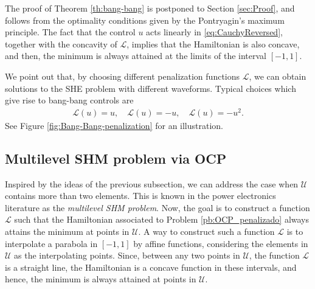 \documentclass[twocolumn]{autart}    %
\begin{document}
The proof of Theorem \ref{th:bang-bang} is postponed to Section \ref{sec:Proof}, and follows from the optimality conditions given by the Pontryagin's maximum principle. The fact that the control $u$ acts linearly in \eqref{eq:CauchyReversed}, together with the concavity of $\mathcal{L}$, implies that the Hamiltonian is also concave, and then, the minimum is always attained at the limits of the interval $[-1,1]$.

We point out that, by choosing different penalization functions $\mathcal{L}$, we can obtain solutions to the SHE problem with different waveforms.
Typical choices which give rise to bang-bang controls are 
\begin{align*}
	\mathcal{L}(u) = u,  \quad \mathcal{L}(u) = -u,  \quad \mathcal{L}(u) = -u^2.
\end{align*} 
See Figure \ref{fig:Bang-Bang-penalization} for an illustration.

\subsection{Multilevel SHM problem via OCP}

Inspired by the ideas of the previous subsection, we can address the case when $\mathcal{U}$ contains more than two elements. This is known in the power electronics literature as the \textit{multilevel SHM problem}. Now, the goal is to construct a function $\mathcal{L}$ such that the Hamiltonian associated to Problem \ref{pb:OCP_penalizado} always attains the minimum at points in $\mathcal{U}$.
A way to construct such a function $\mathcal{L}$ is to interpolate a parabola in $[-1,1]$ by affine functions, considering the elements in $\mathcal{U}$ as the interpolating points.  Since, between any two points in $\mathcal{U}$,  the function $\mathcal{L}$ is a straight line,  the Hamiltonian is a concave function in these intervals, and hence, the minimum is always attained at points in $\mathcal{U}$.
\end{document}
